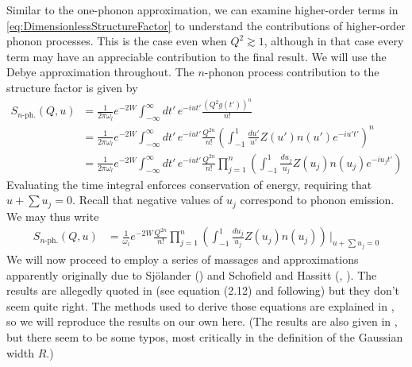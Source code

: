 \documentclass{article}
\begin{document}
Similar to the one-phonon approximation, we can examine higher-order terms in \eqref{eq:DimensionlessStructureFactor} to understand the contributions of higher-order phonon processes. This is the case even when $Q^2 \gtrsim 1$, although in that case every term may have an appreciable contribution to the final result. We will use the Debye approximation throughout. The $n$-phonon process contribution to the structure factor is given by
\begin{align}
S_{n\text{-ph.}}(Q, u) &= \frac{1}{2 \pi \omega_l} e^{-2 W} \int_{-\infty}^\infty dt'\, e^{-iut'} \frac{(Q^2 g(t'))^n}{n!} \nonumber\\
   &= \frac{1}{2 \pi \omega_l} e^{-2 W} \int_{-\infty}^\infty dt'\, e^{-iut'} \frac{Q^{2 n}}{n!} \left( \int_{-1}^1 \frac{du'}{u'}Z(u')n(u')e^{-iu't'} \right)^n \nonumber\\
   &= \frac{1}{2 \pi \omega_l} e^{-2 W} \int_{-\infty}^\infty dt'\, e^{-iut'} \frac{Q^{2 n}}{n!} \prod_{j = 1}^n \left( \int_{-1}^1 \frac{du_j}{u_j}Z(u_j)n(u_j)e^{-iu_jt'} \right)
\end{align}
Evaluating the time integral enforces conservation of energy, requiring that $u + \sum u_j = 0$. Recall that negative values of $u_j$ correspond to phonon emission. We may thus write
\begin{align}
S_{n\text{-ph.}}(Q, u) &= \frac{1}{\omega_l} e^{-2 W} \frac{Q^{2 n}}{n!} \prod_{j = 1}^n \left( \int_{-1}^1 \frac{du_j}{u_j}Z(u_j)n(u_j) \right)\,\bigg|_{u + \sum u_j = 0}
\end{align}
We will now proceed to employ a series of massages and approximations apparently originally due to Sj\"{o}lander (\cite{sj}) and Schofield and Hassitt (\cite{sch1}, \cite{sch2}). The results are allegedly quoted in \cite{impulse} (see equation (2.12) and following) but they don't seem quite right. The methods used to derive those equations are explained in \cite{multiphonon}, so we will reproduce the results on our own here. (The results are also given in \cite{multiphonon}, but there seem to be some typos, most critically in the definition of the Gaussian width $R$.)
\end{document}
